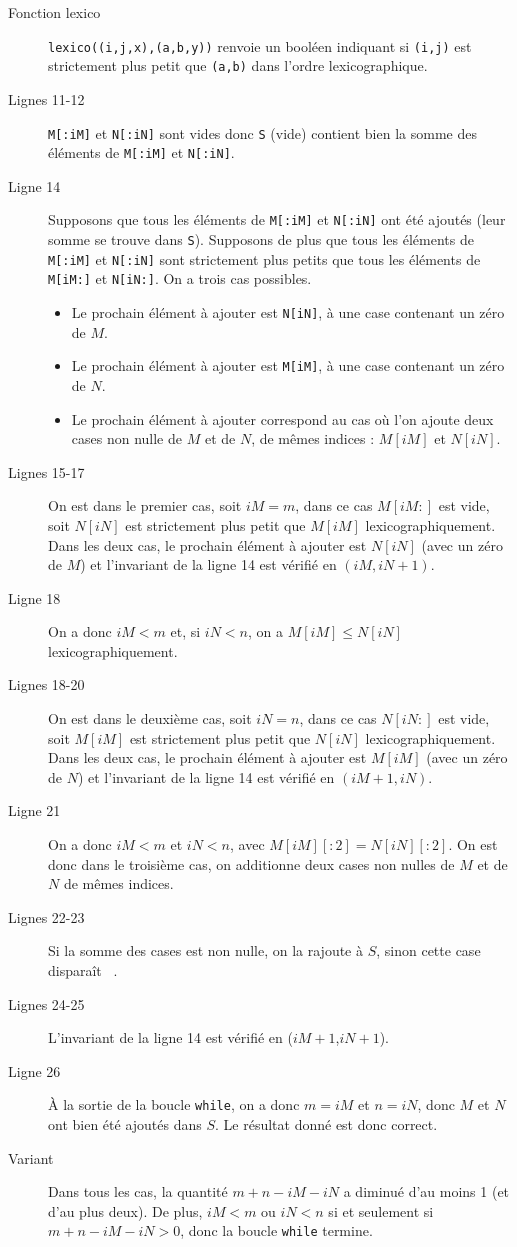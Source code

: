 \begin{description}
  \item[Fonction lexico] \texttt{lexico((i,j,x),(a,b,y))} renvoie un booléen indiquant si \texttt{(i,j)} est strictement plus petit que \texttt{(a,b)} dans l'ordre lexicographique.
  \item[Lignes 11-12] \texttt{M[:iM]} et \texttt{N[:iN]} sont vides donc \texttt{S} (vide) contient bien la somme des éléments de \texttt{M[:iM]} et \texttt{N[:iN]}.
  \item[Ligne 14] Supposons que tous les éléments de \texttt{M[:iM]} et \texttt{N[:iN]} ont été ajoutés (leur somme se trouve dans \texttt{S}). 
    Supposons de plus que tous les éléments de \texttt{M[:iM]} et \texttt{N[:iN]} sont strictement plus petits que tous les éléments de \texttt{M[iM:]} et \texttt{N[iN:]}.
    On a trois cas possibles.
    \begin{itemize}
      \item Le prochain élément à ajouter est \texttt{N[iN]}, à une case contenant un zéro de $M$.
      \item Le prochain élément à ajouter est \texttt{M[iM]}, à une case contenant un zéro de $N$.
      \item Le prochain élément à ajouter correspond au cas où l'on ajoute deux cases non nulle de $M$ et de $N$, de mêmes indices : $M[iM]$ et $N[iN]$. 
    \end{itemize}
  \item[Lignes 15-17] On est dans le premier cas, soit $iM = m$, dans ce cas $M[iM:]$ est vide, soit $N[iN]$ est strictement plus petit que $M[iM]$ lexicographiquement. 
    Dans les deux cas, le prochain élément à ajouter est $N[iN]$ (avec un zéro de $M$) et l'invariant de la ligne 14 est vérifié en $(iM,iN+1)$.
  \item[Ligne 18] On a donc $iM < m$ et, si $iN < n$, on a $M[iM] \leq N[iN]$ lexicographiquement. 
  \item[Lignes 18-20] On est dans le deuxième cas, soit $iN = n$, dans ce cas $N[iN:]$ est vide, soit $M[iM]$ est strictement plus petit que $N[iN]$ lexicographiquement. 
    Dans les deux cas, le prochain élément à ajouter est $M[iM]$ (avec un zéro de $N$) et l'invariant de la ligne 14 est vérifié en $(iM+1,iN)$.
  \item[Ligne 21] On a donc $iM < m$ et $iN < n$, avec $M[iM][:2]  = N[iN][:2]$. On est donc dans le troisième cas, on additionne deux cases non nulles de $M$ et de $N$ de mêmes indices.
  \item[Lignes 22-23] Si la somme des cases est non nulle, on la rajoute à $S$, sinon cette case  \og disparaît \fg\ . 
  \item[Lignes 24-25] L'invariant de la ligne 14 est vérifié en ($iM+1$,$iN+1$).
  \item[Ligne 26] \`A la sortie de la boucle \texttt{while}, on a donc $m = iM$ et $n = iN$, donc $M$ et $N$ ont bien été ajoutés dans $S$. Le résultat donné est donc correct. 
  \item[Variant] Dans tous les cas, la quantité $m+n-iM-iN$ a diminué d'au moins 1 (et d'au plus deux). De plus, $iM < m$ ou $iN < n$ si et seulement si $m+n-iM-iN > 0$, donc la boucle \texttt{while} termine. 
\end{description}

